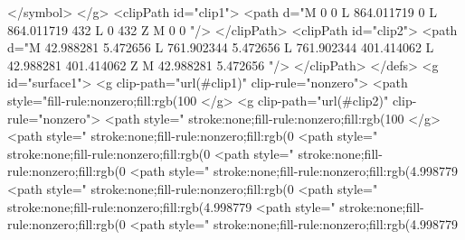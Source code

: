 </symbol>
</g>
<clipPath id="clip1">
  <path d="M 0 0 L 864.011719 0 L 864.011719 432 L 0 432 Z M 0 0 "/>
</clipPath>
<clipPath id="clip2">
  <path d="M 42.988281 5.472656 L 761.902344 5.472656 L 761.902344 401.414062 L 42.988281 401.414062 Z M 42.988281 5.472656 "/>
</clipPath>
</defs>
<g id="surface1">
<g clip-path="url(#clip1)" clip-rule="nonzero">
<path style="fill-rule:nonzero;fill:rgb(100%
</g>
<g clip-path="url(#clip2)" clip-rule="nonzero">
<path style=" stroke:none;fill-rule:nonzero;fill:rgb(100%
</g>
<path style=" stroke:none;fill-rule:nonzero;fill:rgb(0%
<path style=" stroke:none;fill-rule:nonzero;fill:rgb(0%
<path style=" stroke:none;fill-rule:nonzero;fill:rgb(0%
<path style=" stroke:none;fill-rule:nonzero;fill:rgb(4.998779%
<path style=" stroke:none;fill-rule:nonzero;fill:rgb(0%
<path style=" stroke:none;fill-rule:nonzero;fill:rgb(4.998779%
<path style=" stroke:none;fill-rule:nonzero;fill:rgb(0%
<path style=" stroke:none;fill-rule:nonzero;fill:rgb(4.998779%
